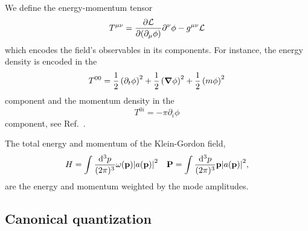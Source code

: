 \begin{definition}
	We define the energy-momentum tensor
	\begin{equation}
		T^{\mu\nu}
		=
		\pdv{\mathcal{L}}{(\partial_\mu\phi)}\partial^\nu\phi
		-
		g^{\mu\nu}\mathcal{L}
		\label{eq:energy_momentum_tensor}
	\end{equation}
	which encodes the field's observables in its components.
	For instance, the energy density is encoded in the
	\begin{equation*}
		T^{00}
		=
		\frac{1}{2}
		\left(\partial_t\phi\right)^2
		+
		\frac{1}{2}
		\left(\grad\phi\right)^2
		+
		\frac{1}{2}
		\left(m\phi\right)^2		
	\end{equation*}
	component and the momentum density in the
	\begin{equation*}
		T^{0i}
		=
		-\pi\partial_i\phi		
	\end{equation*}
	component, see Ref.~\cite{Peskin1995}.
\end{definition}
\begin{lemma}\label{thm:kg_total_energy_momentum}
	The total energy and momentum of the Klein-Gordon field,
	\begin{align}
		H
		=
		\int\frac{\dd[3]{p}}{(2\pi)^3}
		\omega(\vb{p})\abs{a(\vb{p})}^2
		&&
		\vb{P}
		=
		\int\frac{\dd[3]{p}}{(2\pi)^3}
		\vb{p}\abs{a(\vb{p})}^2
		\label{eq:kg_energy_momentum}
		,
	\end{align}
	are the energy and momentum weighted by the mode amplitudes.
\end{lemma}

\subsection{Canonical quantization}

